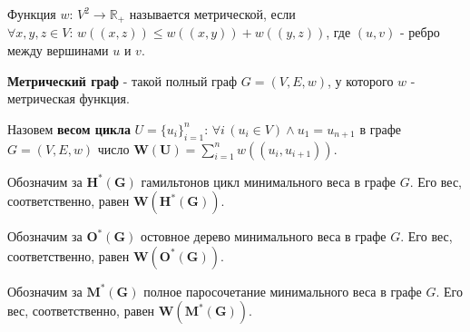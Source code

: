 \begin{definition}
    Функция $w: \, V^2 \rightarrow \mathbb{R_+}$ называется метрической, если $\forall x, y, z \in V: \, w((x, z)) \leq w((x, y)) + w((y, z))$,
    где $(u, v)$ - ребро между вершинами $u$ и $v$.
\end{definition}

\begin{definition}
    \textbf{Метрический граф} - такой полный граф $G = (V, E, w)$, у которого $w$ - метрическая функция.
\end{definition}

\begin{definition}
    Назовем \textnormal{\textbf{весом цикла}} $U = \{u_i\}_{i=1}^{n}: \, \forall i \, (u_i \in V) \wedge u_1 = u_{n+1}$ в графе $G = (V, E, w)$ число
    $\mathbf{W(U)} = \sum\limits^{n}_{i=1}w((u_i, u_{i+1}))$.
\end{definition}

\begin{definition}
    Обозначим за $\mathbf{H^*(G)}$ гамильтонов цикл минимального веса в графе $G$.
    Его вес, соответственно, равен $\mathbf{W(H^*(G))}$.
\end{definition}

\begin{definition}
    Обозначим за $\mathbf{O^*(G)}$ остовное дерево минимального веса в графе $G$.
    Его вес, соответственно, равен $\mathbf{W(O^*(G))}$.
\end{definition}

\begin{definition}
    Обозначим за $\mathbf{M^*(G)}$ полное паросочетание минимального веса в графе $G$.
    Его вес, соответственно, равен $\mathbf{W(M^*(G))}$.
\end{definition}